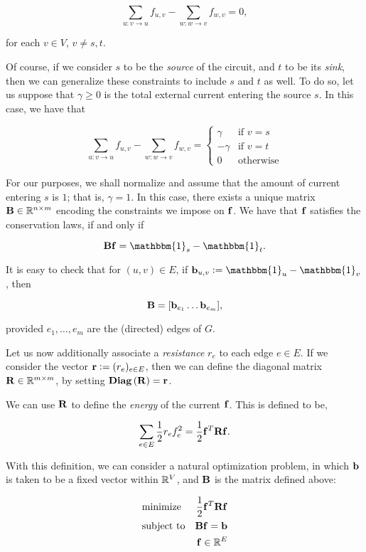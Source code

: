 \documentclass[11pt]{article}
\begin{document}
\[
	\sum_{u: v \rightarrow u} f_{u,v} - \sum_{w: w \rightarrow v} f_{w,v}=0,
\]

for each $v \in V$, $v \neq s,t$.

Of course, if we consider $s$ to be the \textit{source} of the circuit, and
$t$ to be its \textit{sink}, then we can generalize these constraints to include
$s$ and $t$ as well. To do so, let us suppose that $\gamma \ge 0$ is the total
external current entering the source $s$. In this case, we have that

\[ \sum_{u: v \rightarrow u} f_{u,v} - \sum_{w: w \rightarrow v} f_{w,v}=
 \begin{cases}
 \gamma & \text{if $v = s$} 	\\
-\gamma & \text{if $v=t$}		\\
	0  & \text{otherwise}
\end{cases}
\]


For our purposes, we shall normalize and assume that the amount of current 
entering $s$ is $1$; that is, $\gamma=1$. In this case, there exists a 
unique matrix $\V{B} \in \rea^{n \times m}$ encoding the constraints we
impose on $\V{f}$. We have that $\V{f}$ satisfies the conservation laws, if and only
if 

\[
	\V{B}\V{f} = \mathbbm{1}_{s} - \mathbbm{1}_{t}.
\]

It is easy to check that for $(u,v) \in E$, if $\V{b}_{u,v}:= \mathbbm{1}_{u} - \mathbbm{1}_{v}$,
then 

\[
	\V{B} =[\V{b}_{e_1}\ldots \V{b}_{e_m}],
\]

provided $e_{1}, \ldots ,e_{m}$ are the (directed) edges of $G$.

Let us now additionally associate a \textit{resistance} $r_{e}$ to each edge
$e \in E$. If we consider the vector $\V{r}:=(r_{e})_{e \in E}$, then we 
can define the diagonal matrix $\V{R} \in \rea^{m \times m}$, by setting
$\diag{\V{R}}=\V{r}$.

We can use $\V{R}$ to define the \textit{energy} of the current $\V{f}$.
This is defined to be,

\[
	\sum_{e \in E} \frac{1}{2} r_{e} f_{e}^{2} = \frac{1}{2} \V{f}^{T} \V{R} \V{f}.
\]

With this definition, we can consider a natural optimization problem, in which
$\V{b}$ is taken to be a fixed vector within $\mathbb R^{V}$, and $\V{B}$ is the matrix
defined above:

\begin{equation}\label{eqn:energy_optimization}
\begin{aligned}
&{\text{minimize}} & \frac{1}{2} \V{f}^{T}\V{R}\V{f}\\
& \text{subject to} &\V{B}\V{f}=\V{b} \\
&                             & \V{f} \in \rea^E
\end{aligned}
\end{equation}
\end{document}
